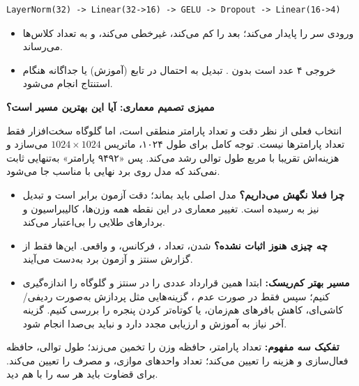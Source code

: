 \documentclass{article}
\newcommand{\pmdash}{\lr{---}}
\newcommand{\mysubsection}[1]{
\par\vspace{0.5cm}
\noindent\textcolor{main_blue}{\large\textbf{#1}}
\par\vspace{0.2cm}
}
\newcommand{\infobox}[1]{%
\vspace{0.3cm}%
\begin{tcolorbox}[
  colback=code_bg,
  colframe=light_gray,
  arc=3pt,
  boxrule=0.5pt,
  left=8pt, right=8pt, top=6pt, bottom=6pt,
  boxsep=0pt
]
#1
\end{tcolorbox}%
\vspace{0.1cm}%
}
\begin{document}
\begin{latin}
\begin{lstlisting}
LayerNorm(32) -> Linear(32->16) -> GELU -> Dropout -> Linear(16->4)
\end{lstlisting}
\end{latin}

\begin{itemize}
\item {} ورودی سر را پایدار می‌کند؛  بعد را کم می‌کند،
 غیرخطی می‌کند، و  به تعداد کلاس‌ها می‌رساند.
\item خروجی ۴ عدد  است \pmdash{} بدون . تبدیل به احتمال در تابع
 (آموزش) یا جداگانه هنگام استنتاج انجام می‌شود.
\end{itemize}

\mysubsection{ممیزی تصمیم معماری: آیا این بهترین مسیر است؟}

انتخاب فعلی از نظر دقت و تعداد پارامتر منطقی است، اما گلوگاه سخت‌افزار فقط تعداد
پارامترها نیست. توجه کامل برای طول ۱۰۲۴، ماتریس $1024\times1024$ می‌سازد و هزینه‌اش
تقریبا با مربع طول توالی رشد می‌کند. پس «۹۴۹۲ پارامتر» به‌تنهایی ثابت نمی‌کند که مدل
روی برد نهایی با  مناسب جا می‌شود.

\begin{itemize}
\item \textbf{چرا فعلا نگهش می‌داریم؟} مدل اصلی باید  بماند؛ دقت آزمون
 برابر  است و تبدیل  نیز به  رسیده است.
تغییر معماری در این نقطه همه وزن‌ها، کالیبراسیون و بردارهای طلایی را بی‌اعتبار می‌کند.
\item \textbf{چه چیزی هنوز اثبات نشده؟}  شدن، تعداد ، فرکانس،
 و  واقعی. این‌ها فقط از گزارش سنتز و آزمون برد به‌دست می‌آیند.
\item \textbf{مسیر بهتر کم‌ریسک:} ابتدا همین قرارداد عددی را در  سنتز و
گلوگاه را اندازه‌گیری کنیم؛ سپس فقط در صورت عدم ، گزینه‌هایی مثل پردازش  به‌صورت
ردیفی/کاشی‌ای، کاهش بافرهای هم‌زمان، یا کوتاه‌تر کردن پنجره را بررسی کنیم. گزینه آخر
نیاز به آموزش و ارزیابی مجدد دارد و نباید بی‌صدا انجام شود.
\end{itemize}

\infobox{
\textbf{تفکیک سه مفهوم:} تعداد پارامتر، حافظه وزن را تخمین می‌زند؛ طول توالی، حافظه
فعال‌سازی و هزینه \lr{attention} را تعیین می‌کند؛ تعداد واحدهای \lr{MAC} موازی، \lr{latency} و مصرف \lr{DSP}
را تعیین می‌کند. برای قضاوت \lr{FPGA} باید هر سه را با هم دید.
}
\end{document}
